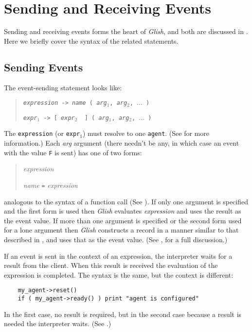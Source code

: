 \section{Sending and Receiving Events}
Sending and receiving events forms the heart of {\em Glish}, and both
are discussed in .  Here we briefly cover
the syntax of the related statements.

\subsection{Sending Events}
\label{send-event-stmt}

The event-sending statement looks like:
\begin{quote}
    {\tt {\em expression} -> {\em name} ( {\em arg$_1$}, {\em arg$_2$}, $\ldots$ )}

    {\tt {\em expr$_1$} -> [ {\em expr$_2$ } ] ( {\em arg$_1$}, {\em arg$_2$}, $\ldots$ )}
\end{quote}
The {\tt expression} (or {\tt expr$_1$}) must resolve to one {\tt agent}.
(See  for more information.)  Each
{\em arg} argument (there needn't be any, in which case an event with
the value {\tt F} is sent) has one of two forms:
\begin{quote}
    {\em expression}

    {\em name} {\tt =} {\em expression}
\end{quote}
analogous to the syntax of a function call
(See ).  If only one argument is specified and the first 
form is used
then {\em Glish} evaluates {\em expression} and uses the
result as the event value.  If more than one argument is specified or
the second form used for a lone argument then {\em Glish} constructs a record
in a manner similar to that described in , and
uses that as the event value.  (See , for a full
discussion.)

If an event is sent in the context of an expression, the interpreter
waits for a result from the client.  When this result is received  
the evaluation of
the expression is completed. The syntax is the same, 
but the context is different:
\begin{verbatim}
    my_agent->reset()
    if ( my_agent->ready() ) print "agent is configured"
\end{verbatim}
In the first case, no result is required, but in the second case
because  a result is needed
the interpreter waits.  (See .)

